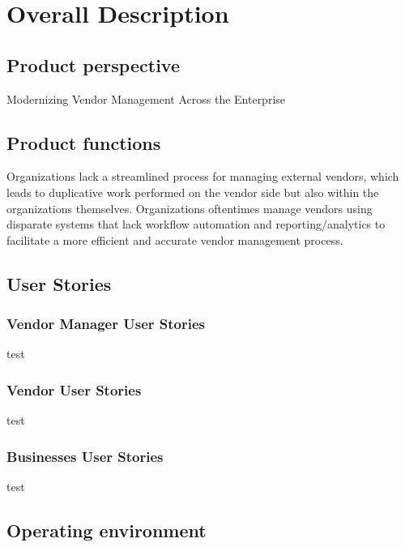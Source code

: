\documentclass[10pt]{article}
\newcounter{subsubsubsection}[subsubsection]
\begin{document}
\section{Overall Description}

\subsection{Product perspective}

Modernizing Vendor Management Across the Enterprise

\subsection{Product functions}

Organizations lack a streamlined process for managing external vendors, which leads to duplicative work performed on the vendor side but also within the organizations themselves. Organizations oftentimes manage vendors using disparate systems that lack workflow automation and reporting/analytics to facilitate a more efficient and accurate vendor management process.

\subsection{User Stories}

\subsubsection{Vendor Manager User Stories}

test
	
\subsubsection{Vendor User Stories}

test

\subsubsection{Businesses User Stories}

test

\subsection{Operating environment}
\end{document}
